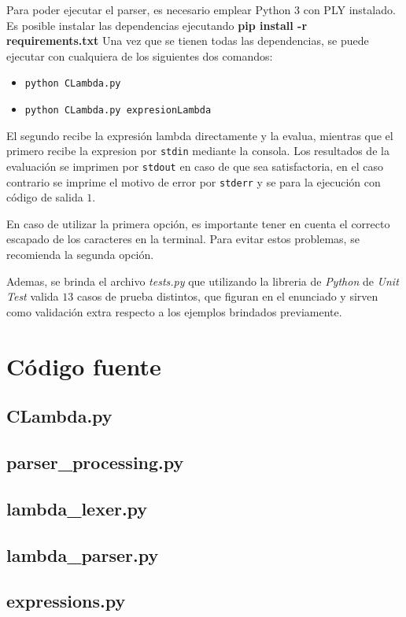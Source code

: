 \documentclass{article}
\theoremstyle{definition}
\theoremstyle{remark}
\begin{document}
Para poder ejecutar el parser, es necesario emplear Python 3 con PLY instalado. Es posible instalar las dependencias ejecutando \textbf{pip install -r requirements.txt }Una vez que se tienen todas las dependencias, se puede ejecutar con cualquiera de los siguientes dos comandos:

\begin{itemize}
	\item \texttt{python CLambda.py}
	\item \texttt{python CLambda.py expresionLambda}
\end{itemize}

El segundo recibe la expresión lambda directamente y la evalua, mientras que el primero recibe la expresion por \texttt{stdin} mediante la consola. Los resultados de la evaluación se imprimen por \texttt{stdout} en caso de que sea satisfactoria, en el caso contrario se imprime el motivo de error por \texttt{stderr} y se para la ejecución con código de salida $1$.

En caso de utilizar la primera opción, es importante tener en cuenta el correcto escapado de los caracteres en la terminal. Para evitar estos problemas, se recomienda la segunda opción.

Ademas, se brinda el archivo \emph{tests.py} que utilizando la libreria de \emph{Python} de \emph{Unit Test} valida $13$ casos de prueba distintos, que figuran en el enunciado y sirven como validación extra respecto a los ejemplos brindados previamente. 

\section{Código fuente}

\subsection{CLambda.py}
\begin{small}
  
\end{small}

\subsection{parser\_processing.py}
\begin{small}
  
\end{small}

\subsection{lambda\_lexer.py}
\begin{small}
  
\end{small}

\subsection{lambda\_parser.py}
\begin{small}
  
\end{small}

\subsection{expressions.py}
\begin{small}
  
\end{small}
\end{document}
